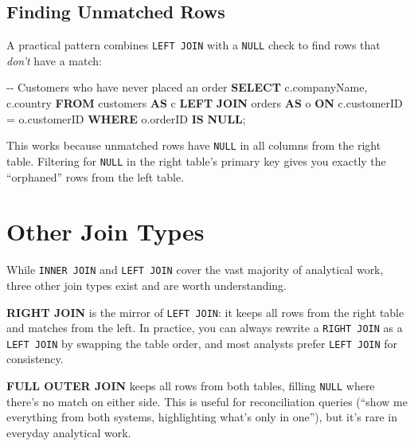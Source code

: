 \documentclass[
  letterpaper,
  DIV=11,
  numbers=noendperiod]{scrreprt}
\newenvironment{Shaded}{\begin{snugshade}}{\end{snugshade}}
\newcommand{\CommentTok}[1]{\textcolor[rgb]{0.37,0.37,0.37}{#1}}
\newcommand{\KeywordTok}[1]{\textcolor[rgb]{0.00,0.23,0.31}{\textbf{#1}}}
\newcommand{\NormalTok}[1]{\textcolor[rgb]{0.00,0.23,0.31}{#1}}
\newcommand{\OperatorTok}[1]{\textcolor[rgb]{0.37,0.37,0.37}{#1}}
\begin{document}
\subsection{Finding Unmatched Rows}\label{finding-unmatched-rows}

A practical pattern combines \texttt{LEFT\ JOIN} with a \texttt{NULL}
check to find rows that \emph{don't} have a match:

\begin{codelisting}

\caption{\texttt{duckdb}}

\begin{Shaded}
\begin{Highlighting}[]
\CommentTok{{-}{-} Customers who have never placed an order}
\KeywordTok{SELECT}
\NormalTok{    c.companyName,}
\NormalTok{    c.country}
\KeywordTok{FROM}\NormalTok{ customers }\KeywordTok{AS}\NormalTok{ c}
\KeywordTok{LEFT} \KeywordTok{JOIN}\NormalTok{ orders }\KeywordTok{AS}\NormalTok{ o}
    \KeywordTok{ON}\NormalTok{ c.customerID }\OperatorTok{=}\NormalTok{ o.customerID}
\KeywordTok{WHERE}\NormalTok{ o.orderID }\KeywordTok{IS} \KeywordTok{NULL}\NormalTok{;}
\end{Highlighting}
\end{Shaded}

\end{codelisting}

This works because unmatched rows have \texttt{NULL} in all columns from
the right table. Filtering for \texttt{NULL} in the right table's
primary key gives you exactly the ``orphaned'' rows from the left table.

\section{Other Join Types}\label{other-join-types}

While \texttt{INNER\ JOIN} and \texttt{LEFT\ JOIN} cover the vast
majority of analytical work, three other join types exist and are worth
understanding.

\textbf{RIGHT JOIN} is the mirror of \texttt{LEFT\ JOIN}: it keeps all
rows from the right table and matches from the left. In practice, you
can always rewrite a \texttt{RIGHT\ JOIN} as a \texttt{LEFT\ JOIN} by
swapping the table order, and most analysts prefer \texttt{LEFT\ JOIN}
for consistency.

\textbf{FULL OUTER JOIN} keeps all rows from both tables, filling
\texttt{NULL} where there's no match on either side. This is useful for
reconciliation queries (``show me everything from both systems,
highlighting what's only in one''), but it's rare in everyday analytical
work.
\end{document}
